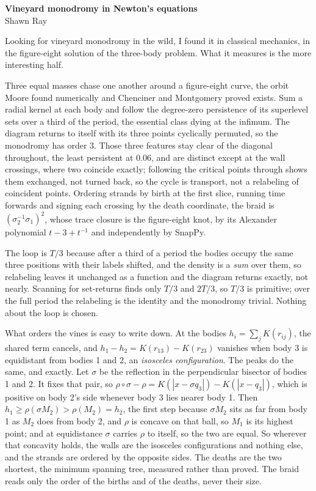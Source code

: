 \documentclass[11pt]{article}
\begin{document}
\begin{center}
  {\large\bfseries Vineyard monodromy in Newton's equations}\\[0.3em]
  {\small Shawn Ray}
\end{center}

\vspace{0.2em}

Looking for vineyard monodromy in the wild, I found it in classical mechanics,
in the figure-eight solution of the three-body problem. What it measures is the
more interesting half.

Three equal masses chase one another around a figure-eight curve, the orbit
Moore found numerically and Chenciner and Montgomery proved exists. Sum a radial
kernel at each body and follow the degree-zero persistence of its superlevel
sets over a third of the period, the essential class dying at the infimum. The
diagram returns to itself with its three points cyclically permuted, so the
monodromy has order $3$. Those three features stay clear of the diagonal
throughout, the least persistent at $0.06$, and are distinct except at the wall
crossings, where two coincide exactly; following the critical points through
shows them exchanged, not turned back, so the cycle is transport, not a
relabeling of coincident points. Ordering strands by birth at the first slice,
running time forwards and signing each crossing by the death coordinate, the
braid is $(\sigma_2^{-1}\sigma_1)^2$, whose trace closure is the figure-eight
knot, by its Alexander polynomial $t-3+t^{-1}$ and independently by SnapPy.

The loop is $T/3$ because after a third of a period the bodies occupy the same
three positions with their labels shifted, and the density is a \emph{sum} over
them, so relabeling leaves it unchanged as a function and the diagram returns
exactly, not nearly. Scanning for set-returns finds only $T/3$ and $2T/3$, so
$T/3$ is primitive; over the full period the relabeling is the identity and the
monodromy trivial. Nothing about the loop is chosen.

What orders the vines is easy to write down. At the bodies $h_i=\sum_j
K(r_{ij})$, the shared term cancels, and $h_1-h_2=K(r_{13})-K(r_{23})$ vanishes
when body 3 is equidistant from bodies 1 and 2, an \emph{isosceles
configuration}. The peaks do the same, and exactly. Let $\sigma$ be the
reflection in the perpendicular bisector of bodies 1 and 2. It fixes that pair,
so $\rho\circ\sigma-\rho=K(|x-\sigma q_3|)-K(|x-q_3|)$, which is positive on
body 2's side whenever body 3 lies nearer body 1. Then $h_1\ge\rho(\sigma
M_2)>\rho(M_2)=h_2$, the first step because $\sigma M_2$ sits as far from body 1
as $M_2$ does from body 2, and $\rho$ is concave on that ball, so $M_1$ is its
highest point; and at equidistance $\sigma$ carries $\rho$ to itself, so the two
are equal. So wherever that concavity holds, the walls are the isosceles
configurations and nothing else, and the strands are ordered by the opposite
sides. The deaths are the two shortest, the minimum spanning tree, measured
rather than proved. The braid reads only the order of the births and of the
deaths, never their size.
\end{document}
